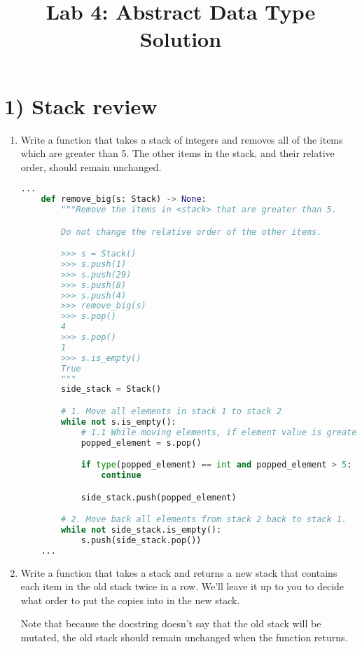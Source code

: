 \documentclass[12pt]{article}
\begin{document}
\title{Lab 4: Abstract Data Type Solution}
\date{}
\maketitle

\section*{1) Stack review}
\begin{enumerate}[1.]
    \item Write a function that takes a stack of integers and removes all of the items which are greater than 5.
    The other items in the stack, and their relative order, should remain unchanged.

    \begin{lstlisting}[language=Python,caption={task\_1\_solution.py},captionpos=b]
    ...
    def remove_big(s: Stack) -> None:
        """Remove the items in <stack> that are greater than 5.

        Do not change the relative order of the other items.

        >>> s = Stack()
        >>> s.push(1)
        >>> s.push(29)
        >>> s.push(8)
        >>> s.push(4)
        >>> remove_big(s)
        >>> s.pop()
        4
        >>> s.pop()
        1
        >>> s.is_empty()
        True
        """
        side_stack = Stack()

        # 1. Move all elements in stack 1 to stack 2
        while not s.is_empty():
            # 1.1 While moving elements, if element value is greater than 5, then pass
            popped_element = s.pop()

            if type(popped_element) == int and popped_element > 5:
                continue

            side_stack.push(popped_element)

        # 2. Move back all elements from stack 2 back to stack 1.
        while not side_stack.is_empty():
            s.push(side_stack.pop())
    ...
    \end{lstlisting}

    \item Write a function that takes a stack and returns a new stack that contains each item in the old stack twice in a row.
    We’ll leave it up to you to decide what order to put the copies into in the new stack.

    \bigskip

    Note that because the docstring doesn’t say that the old stack will be mutated,
    the old stack should remain unchanged when the function returns.
\end{enumerate}

\bigskip
\end{document}
